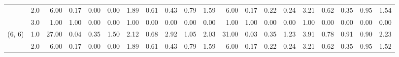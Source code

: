 \begin{tabular}{llrrrrrrrrrrrrrrrrrr}
       & 2.0 &               6.00 &                     0.17 &                                 0.00 &                             0.00 &                           1.89 &                                               0.61 &                                            0.43 &                                            0.79 &                                        1.59 &               6.00 &                     0.17 &                                 0.22 &                             0.24 &                           3.21 &                                               0.62 &                                            0.35 &                                            0.95 &                                        1.54 \\
       & 3.0 &               1.00 &                     1.00 &                                 0.00 &                             0.00 &                           1.00 &                                               0.00 &                                            0.00 &                                            0.00 &                                        0.00 &               1.00 &                     1.00 &                                 0.00 &                             0.00 &                           1.00 &                                               0.00 &                                            0.00 &                                            0.00 &                                        0.00 \\
(6, 6) & 1.0 &              27.00 &                     0.04 &                                 0.35 &                             1.50 &                           2.12 &                                               0.68 &                                            2.92 &                                            1.05 &                                        2.03 &              31.00 &                     0.03 &                                 0.35 &                             1.23 &                           3.91 &                                               0.78 &                                            0.91 &                                            0.90 &                                        2.23 \\
       & 2.0 &               6.00 &                     0.17 &                                 0.00 &                             0.00 &                           1.89 &                                               0.61 &                                            0.43 &                                            0.79 &                                        1.59 &               6.00 &                     0.17 &                                 0.22 &                             0.24 &                           3.21 &                                               0.62 &                                            0.35 &                                            0.95 &                                        1.52 \\

\end{tabular}
